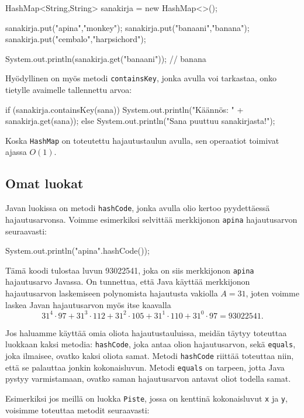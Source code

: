 \begin{code}
HashMap<String,String> sanakirja = new HashMap<>();

sanakirja.put("apina","monkey");
sanakirja.put("banaani","banana");
sanakirja.put("cembalo","harpsichord");

System.out.println(sanakirja.get("banaani")); // banana
\end{code}

Hyödyllinen on myös metodi \texttt{containsKey},
jonka avulla voi tarkastaa, onko tietylle avaimelle
tallennettu arvoa:

\begin{code}
if (sanakirja.containsKey(sana)) {
    System.out.println("Käännös: " + sanakirja.get(sana));
} else {
    System.out.println("Sana puuttuu sanakirjasta!");
}
\end{code}

Koska \texttt{HashMap} on toteutettu hajautustaulun avulla,
sen operaatiot toimivat ajassa $O(1)$.

\subsection{Omat luokat}

Javan luokissa on metodi \texttt{hashCode},
jonka avulla olio kertoo pyydettäessä hajautusarvonsa.
Voimme esimerkiksi selvittää merkkijonon \texttt{apina}
hajautusarvon seuraavasti:

\begin{code}
System.out.println("apina".hashCode());
\end{code}

Tämä koodi tulostaa luvun 93022541,
joka on siis merkkijonon \texttt{apina} hajautusarvo Javassa.
On tunnettua, että Java käyttää merkkijonon hajautusarvon laskemiseen
polynomista hajautusta vakiolla $A=31$,
joten voimme laskea Javan hajautusarvon myös itse kaavalla
\[31^4 \cdot 97+31^3 \cdot 112+31^2 \cdot 105+31^1 \cdot 110+31^0 \cdot 97=93022541.\]

Jos haluamme käyttää omia oliota hajautustauluissa,
meidän täytyy toteuttaa luokkaan kaksi metodia:
\texttt{hashCode}, joka antaa olion hajautusarvon,
sekä \texttt{equals},
joka ilmaisee, ovatko kaksi oliota samat.
Metodi \texttt{hashCode} riittää toteuttaa niin,
että se palauttaa jonkin kokonaisluvun.
Metodi \texttt{equals} on tarpeen,
jotta Java pystyy varmistamaan, ovatko saman hajautusarvon
antavat oliot todella samat.

Esimerkiksi jos meillä on luokka \texttt{Piste},
jossa on kenttinä kokonaisluvut \texttt{x} ja \texttt{y},
voisimme toteuttaa metodit seuraavasti:

